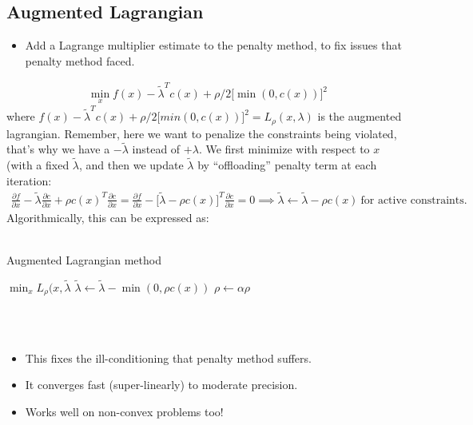 \subsection{Augmented Lagrangian}
\begin{itemize}
    \item Add a Lagrange multiplier estimate to the penalty method,  to fix issues that penalty method faced.
\end{itemize}
\begin{align}
    \min_x f(x) - \tilde{\lambda}^T c(x) + \rho /2 \big[ \min(0,c(x)) \big]^2
\end{align}
where $f(x) - \tilde{\lambda}^T c(x) + \rho /2 \big[ min(0,c(x)) \big]^2 = L_{\rho}(x,\lambda)$ is the augmented lagrangian. 
Remember, here we want to penalize the constraints being violated, that's why we have a $-\tilde{\lambda}$ instead of $+\lambda$.
We first minimize with respect to $x$ (with a fixed $\tilde{\lambda}$, and then we update $\tilde{\lambda}$ by ``offloading'' penalty term at each iteration: 
\begin{align}
    \frac{\partial f}{\partial x} - \tilde{\lambda} \frac{\partial c}{\partial x} + \rho c(x)^T \frac{\partial c}{\partial x} = \frac{\partial f}{\partial x} - \big[ \tilde{\lambda} - \rho c(x) \big]^T \frac{\partial c}{\partial x} = 0
    \implies \tilde{\lambda} \gets \tilde{\lambda} - \rho c(x) \ \textrm{for active constraints}.
\end{align}
Algorithmically, this can be expressed as: 
\\
\\
\noindent
\begin{algorithm}
	\caption{Augmented Lagrangian method}
	\label{alg:auglag}
	\begin{algorithmic}[1]	
            \State $\min_x L_{\rho} (x, \tilde{\lambda}$ 
            \State $\tilde{\lambda} \gets \tilde{\lambda} - \min(0,\rho c(x)) $ 
            \State $\rho \gets \alpha \rho$ 
        \EndWhile
	\end{algorithmic}
\end{algorithm}
\\
\\
\begin{itemize}
    \item This fixes the ill-conditioning that penalty method suffers. 
    \item It converges fast (super-linearly) to moderate precision. 
    \item Works well on non-convex problems too! 
\end{itemize}

